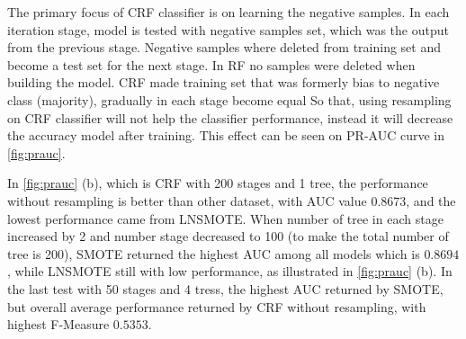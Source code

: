 The primary focus of CRF classifier is on learning the negative samples.
In each iteration stage, model is tested with negative samples set, which was
the output from the previous stage.
Negative samples where deleted from training set and become a test set for the
next stage.
In RF no samples were deleted when building the model.
CRF made training set that was formerly bias to negative class (majority),
gradually in each stage become equal
So that, using resampling on CRF classifier will not help the classifier
performance, instead it will decrease the accuracy model after training.
This effect can be seen on PR-AUC curve in \figurename \ref{fig:prauc}.

In \figurename \ref{fig:prauc} (b), which is CRF with 200 stages and 1 tree, the
performance without resampling is better than other dataset, with AUC
value $0.8673$, and the lowest performance came from LNSMOTE.
When number of tree in each stage increased by 2 and number stage decreased to
100 (to make the total number of tree is 200), SMOTE returned the highest AUC
among all models which is $0.8694$, while LNSMOTE still with low performance,
as illustrated in \figurename \ref{fig:prauc} (b).
In the last test with 50 stages and 4 tress, the highest AUC returned by SMOTE,
but overall average performance returned by CRF without resampling, with
highest F-Measure $0.5353$.
